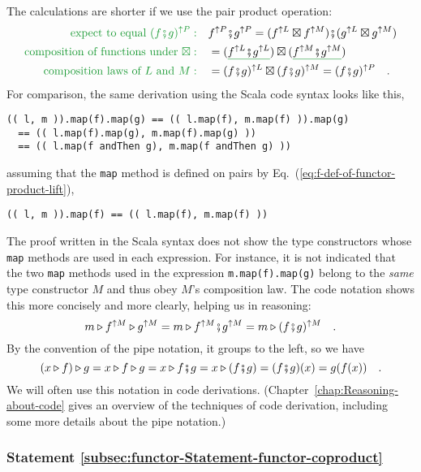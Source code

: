 The calculations are shorter if we use the pair product operation:
\begin{align*}
{\color{greenunder}\text{expect to equal }(f\bef g)^{\uparrow P}:}\quad & f^{\uparrow P}\bef g^{\uparrow P}=(f^{\uparrow L}\boxtimes f^{\uparrow M})\bef(g^{\uparrow L}\boxtimes g^{\uparrow M})\\
{\color{greenunder}\text{composition of functions under }\boxtimes:}\quad & =(\gunderline{f^{\uparrow L}\bef g^{\uparrow L}})\boxtimes(\gunderline{f^{\uparrow M}\bef g^{\uparrow M}})\\
{\color{greenunder}\text{composition laws of }L\text{ and }M:}\quad & =(f\bef g)^{\uparrow L}\boxtimes(f\bef g)^{\uparrow M}=(f\bef g)^{\uparrow P}\quad.
\end{align*}
For comparison, the same derivation using the Scala code syntax looks
like this,
\begin{lstlisting}
(( l, m )).map(f).map(g) == (( l.map(f), m.map(f) )).map(g)
  == (( l.map(f).map(g), m.map(f).map(g) ))
  == (( l.map(f andThen g), m.map(f andThen g) )) 
\end{lstlisting}
assuming that the \lstinline!map! method is defined on pairs by Eq.~(\ref{eq:f-def-of-functor-product-lift}),
\begin{lstlisting}
(( l, m )).map(f) == (( l.map(f), m.map(f) ))
\end{lstlisting}
The proof written in the Scala syntax does not show the type constructors
whose \lstinline!map! methods are used in each expression. For instance,
it is not indicated that the two \lstinline!map! methods used in
the expression \lstinline!m.map(f).map(g)! belong to the \emph{same}
type constructor $M$ and thus obey $M$\textsf{'}s composition law. The code
notation shows this more concisely and more clearly, helping us in
reasoning:
\[
m\triangleright f^{\uparrow M}\triangleright g^{\uparrow M}=m\triangleright f^{\uparrow M}\bef g^{\uparrow M}=m\triangleright(f\bef g)^{\uparrow M}\quad.
\]
By the convention of the pipe notation, it groups to the left, so
we have
\[
\left(x\triangleright f\right)\triangleright g=x\triangleright f\triangleright g=x\triangleright f\bef g=x\triangleright(f\bef g)=(f\bef g)(x)=g(f(x))\quad.
\]
We will often use this notation in code derivations. (Chapter~\ref{chap:Reasoning-about-code}
gives an overview of the techniques of code derivation, including
some more details about the pipe notation.)

\subsubsection{Statement \label{subsec:functor-Statement-functor-coproduct}\ref{subsec:functor-Statement-functor-coproduct}}

